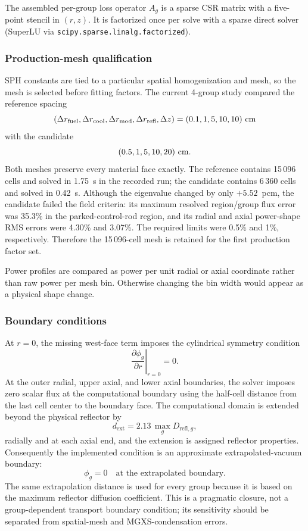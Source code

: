 \documentclass[11pt]{article}
\begin{document}
The assembled per-group loss operator $A_g$ is a sparse CSR matrix with a
five-point stencil in $(r,z)$.  It is factorized once per solve with a sparse
direct solver (SuperLU via \texttt{scipy.sparse.linalg.factorized}).

\subsubsection{Production-mesh qualification}

SPH constants are tied to a particular spatial homogenization and mesh, so the
mesh is selected before fitting factors.  The current 4-group study compared
the reference spacing
\[
(\Delta r_{\mathrm{fuel}},\Delta r_{\mathrm{cool}},
 \Delta r_{\mathrm{mod}},\Delta r_{\mathrm{refl}},\Delta z)
=(0.1,1,5,10,10)\ {\rm cm}
\]
with the candidate
\[
(0.5,1,5,10,20)\ {\rm cm}.
\]
Both meshes preserve every material face exactly.  The reference contains
15\,096 cells and solved in 1.75~s in the recorded run; the candidate contains
6\,360 cells and solved in 0.42~s.  Although the eigenvalue changed by only
$+5.52$~pcm, the candidate failed the field criteria: its maximum resolved
region/group flux error was 35.3\% in the parked-control-rod region, and its
radial and axial power-shape RMS errors were 4.30\% and 3.07\%.  The required
limits were 0.5\% and 1\%, respectively.  Therefore the 15\,096-cell mesh is
retained for the first production factor set.

Power profiles are compared as power per unit radial or axial coordinate
rather than raw power per mesh bin.  Otherwise changing the bin width would
appear as a physical shape change.

\subsubsection{Boundary conditions}

At $r=0$, the missing west-face term imposes the cylindrical symmetry
condition
\[
\left.\frac{\partial\phi_g}{\partial r}\right|_{r=0}=0 .
\]
At the outer radial, upper axial, and lower axial boundaries, the solver
imposes zero scalar flux at the computational boundary using the half-cell
distance from the last cell center to the boundary face.  The computational
domain is extended beyond the physical reflector by
\[
d_{\mathrm{ext}} = 2.13\,\max_g D_{\mathrm{refl},g},
\]
radially and at each axial end, and the extension is assigned reflector
properties.  Consequently the implemented condition is an approximate
extrapolated-vacuum boundary:
\[
\phi_g=0
\quad\text{at the extrapolated boundary.}
\]
The same extrapolation distance is used for every group because it is based on
the maximum reflector diffusion coefficient.  This is a pragmatic closure,
not a group-dependent transport boundary condition; its sensitivity should be
separated from spatial-mesh and MGXS-condensation errors.
\end{document}

